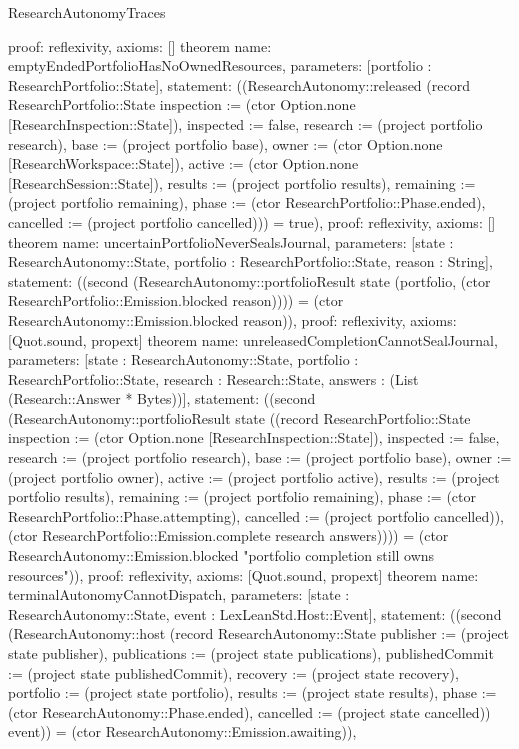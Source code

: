 \begin{lexlean}{ResearchAutonomyTraces}
\begin{semanticmodule}
{ proof: reflexivity{},
 axioms: []
}
theorem{
 name: emptyEndedPortfolioHasNoOwnedResources,
 parameters: [portfolio : ResearchPortfolio::State],
 statement: ((ResearchAutonomy::released (record ResearchPortfolio::State {inspection := (ctor Option.none [ResearchInspection::State]), inspected := false, research := (project portfolio research), base := (project portfolio base), owner := (ctor Option.none [ResearchWorkspace::State]), active := (ctor Option.none [ResearchSession::State]), results := (project portfolio results), remaining := (project portfolio remaining), phase := (ctor ResearchPortfolio::Phase.ended), cancelled := (project portfolio cancelled)})) = true),
 proof: reflexivity{},
 axioms: []
}
theorem{
 name: uncertainPortfolioNeverSealsJournal,
 parameters: [state : ResearchAutonomy::State, portfolio : ResearchPortfolio::State, reason : String],
 statement: ((second (ResearchAutonomy::portfolioResult state (portfolio, (ctor ResearchPortfolio::Emission.blocked reason)))) = (ctor ResearchAutonomy::Emission.blocked reason)),
 proof: reflexivity{},
 axioms: [Quot.sound, propext]
}
theorem{
 name: unreleasedCompletionCannotSealJournal,
 parameters: [state : ResearchAutonomy::State, portfolio : ResearchPortfolio::State, research : Research::State, answers : (List (Research::Answer * Bytes))],
 statement: ((second (ResearchAutonomy::portfolioResult state ((record ResearchPortfolio::State {inspection := (ctor Option.none [ResearchInspection::State]), inspected := false, research := (project portfolio research), base := (project portfolio base), owner := (project portfolio owner), active := (project portfolio active), results := (project portfolio results), remaining := (project portfolio remaining), phase := (ctor ResearchPortfolio::Phase.attempting), cancelled := (project portfolio cancelled)}), (ctor ResearchPortfolio::Emission.complete research answers)))) = (ctor ResearchAutonomy::Emission.blocked "portfolio completion still owns resources")),
 proof: reflexivity{},
 axioms: [Quot.sound, propext]
}
theorem{
 name: terminalAutonomyCannotDispatch,
 parameters: [state : ResearchAutonomy::State, event : LexLeanStd.Host::Event],
 statement: ((second (ResearchAutonomy::host (record ResearchAutonomy::State {publisher := (project state publisher), publications := (project state publications), publishedCommit := (project state publishedCommit), recovery := (project state recovery), portfolio := (project state portfolio), results := (project state results), phase := (ctor ResearchAutonomy::Phase.ended), cancelled := (project state cancelled)}) event)) = (ctor ResearchAutonomy::Emission.awaiting)),
}
\end{semanticmodule}
\end{lexlean}
